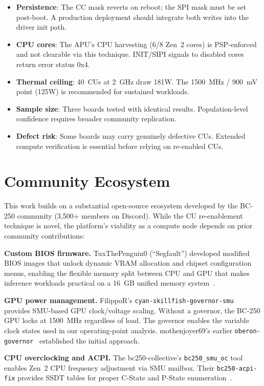 \documentclass[11pt,twocolumn]{article}
\begin{document}
\begin{itemize}[nosep]
    \item \textbf{Persistence}: The CC mask reverts on reboot; the SPI mask must be set post-boot. A production deployment should integrate both writes into the driver init path.
    \item \textbf{CPU cores}: The APU's CPU harvesting (6/8 Zen~2 cores) is PSP-enforced and not clearable via this technique. INIT/SIPI signals to disabled cores return error status 0x4.
    \item \textbf{Thermal ceiling}: 40~CUs at 2~GHz draw 181W. The 1500~MHz / 900~mV point (125W) is recommended for sustained workloads.
    \item \textbf{Sample size}: Three boards tested with identical results. Population-level confidence requires broader community replication.
    \item \textbf{Defect risk}: Some boards may carry genuinely defective CUs. Extended compute verification is essential before relying on re-enabled CUs.
\end{itemize}

\section{Community Ecosystem}
\label{sec:community}

This work builds on a substantial open-source ecosystem developed by the BC-250 community (3,500+ members on Discord). While the CU re-enablement technique is novel, the platform's viability as a compute node depends on prior community contributions:

\textbf{Custom BIOS firmware.}
TuxThePenguin0 (``Segfault'') developed modified BIOS images that unlock dynamic VRAM allocation and chipset configuration menus, enabling the flexible memory split between CPU and GPU that makes inference workloads practical on a 16~GB unified memory system~\cite{bios}.

\textbf{GPU power management.}
FilippoR's \texttt{cyan-skillfish-governor-smu}~\cite{governor_smu} provides SMU-based GPU clock/voltage scaling. Without a governor, the BC-250 GPU locks at 1500~MHz regardless of load. The governor enables the variable clock states used in our operating-point analysis. mothenjoyer69's earlier \texttt{oberon-governor}~\cite{governor} established the initial approach.

\textbf{CPU overclocking and ACPI.}
The bc250-collective's \texttt{bc250\_smu\_oc} tool enables Zen~2 CPU frequency adjustment via SMU mailbox. Their \texttt{bc250-acpi-fix} provides SSDT tables for proper C-State and P-State enumeration~\cite{smuoc,acpifix}.
\end{document}
